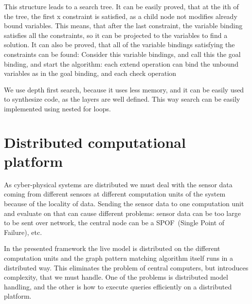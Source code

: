 This structure leads to a search tree.
It can be easily proved, that at the ith of the tree, the first x constraint is satisfied, as a child node not modifies already bound variables.
This means, that after the last constraint, the variable binding satisfies all the constraints, so it can be projected to the variables to find a solution.
It can also be proved, that all of the variable bindings satisfying the constraints can be found: 
Consider this variable bindings, and call this the goal binding, and start the algorithm: each extend operation can bind the unbound variables as in the goal binding, and each check operation 

We use depth first search, because it uses less memory, and it can be easily used to synthesize code, as the layers are well defined. This way search can be easily implemented using nested for loops.


\section{Distributed computational platform}


As cyber-physical systems are distributed we must deal with the sensor data coming from different sensors at different computation units of the system because of the locality of data. 
Sending the sensor data to one computation unit and evaluate on that can cause different problems: 
sensor data can be too large to be sent over network, the central node can be a SPOF~(Single Point of Failure), etc. 

In the presented framework the live model is distributed on the different computation units and the graph pattern matching algorithm itself runs in a distributed way. 
This eliminates the problem of central computers, but introduces complexity, that we must handle.
One of the problems is distributed model handling, and the other is how to execute queries efficiently on a distributed platform.



